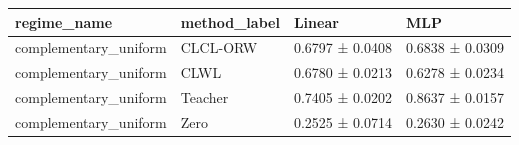 \begin{tabular}{llll}
\toprule
regime_name & method_label & Linear & MLP \\
\midrule
complementary_uniform & CLCL-ORW & 0.6797 ± 0.0408 & 0.6838 ± 0.0309 \\
complementary_uniform & CLWL & 0.6780 ± 0.0213 & 0.6278 ± 0.0234 \\
complementary_uniform & Teacher & 0.7405 ± 0.0202 & 0.8637 ± 0.0157 \\
complementary_uniform & Zero & 0.2525 ± 0.0714 & 0.2630 ± 0.0242 \\
\bottomrule
\end{tabular}

